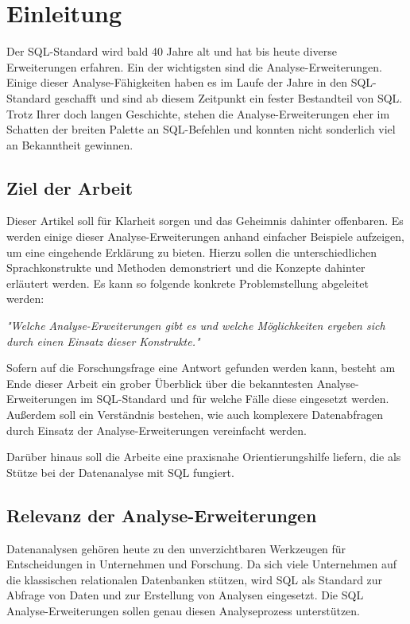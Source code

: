 \chapter{Einleitung}
Der SQL-Standard wird bald 40 Jahre alt und hat bis heute diverse Erweiterungen erfahren.
Ein der wichtigsten sind die Analyse-Erweiterungen. Einige dieser Analyse-Fähigkeiten
haben es im Laufe der Jahre in den SQL-Standard geschafft und sind ab diesem Zeitpunkt
ein fester Bestandteil von SQL. Trotz Ihrer doch langen Geschichte, stehen die Analyse-Erweiterungen
eher im Schatten der breiten Palette an SQL-Befehlen und konnten nicht sonderlich
viel an Bekanntheit gewinnen.

\section{Ziel der Arbeit}
Dieser Artikel soll für Klarheit sorgen und das Geheimnis dahinter offenbaren.
Es werden einige dieser Analyse-Erweiterungen anhand einfacher Beispiele
aufzeigen, um eine eingehende Erklärung zu bieten. Hierzu sollen die
unterschiedlichen Sprachkonstrukte und Methoden demonstriert und die Konzepte
dahinter erläutert werden. Es kann so folgende konkrete Problemstellung abgeleitet
werden:

\begin{center}
	\textit{"Welche Analyse-Erweiterungen gibt es und welche Möglichkeiten ergeben
	sich durch einen Einsatz dieser Konstrukte."}
\end{center}

Sofern auf die Forschungsfrage eine Antwort gefunden werden kann, besteht am Ende
dieser Arbeit ein grober Überblick über die bekanntesten Analyse-Erweiterungen im
SQL-Standard und für welche Fälle diese eingesetzt werden. Außerdem soll ein
Verständnis bestehen, wie auch komplexere Datenabfragen durch Einsatz der Analyse-Erweiterungen
vereinfacht werden.

Darüber hinaus soll die Arbeite eine praxisnahe Orientierungshilfe liefern, die
als Stütze bei der Datenanalyse mit SQL fungiert.

\section{Relevanz der Analyse-Erweiterungen}
Datenanalysen gehören heute zu den unverzichtbaren Werkzeugen für Entscheidungen
in Unternehmen und Forschung. Da sich viele Unternehmen auf die klassischen relationalen
Datenbanken stützen, wird SQL als Standard zur Abfrage von Daten und zur
Erstellung von Analysen eingesetzt. Die SQL Analyse-Erweiterungen sollen genau diesen
Analyseprozess unterstützen.

